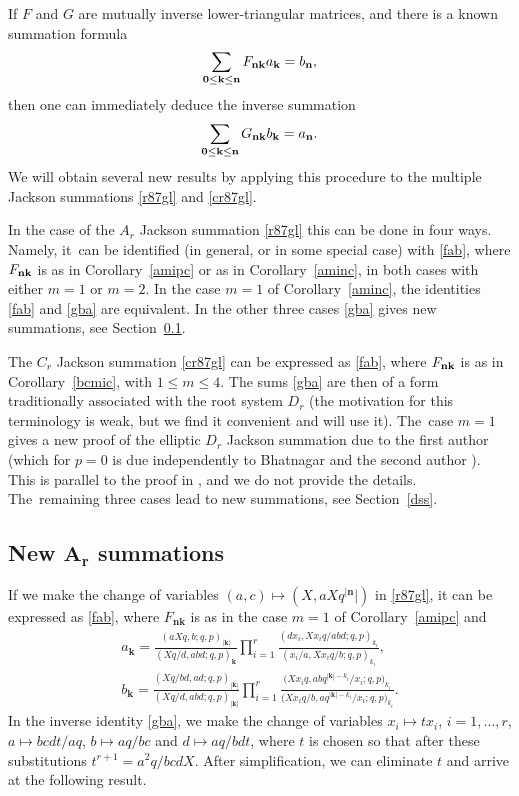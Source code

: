 \documentclass[pdftex]{sigma}%
\numberwithin{equation}{section}
\newcommand\bn{\mathbf n}
\newcommand\bk{\mathbf k}
\begin{document}
If $F$ and $G$ are mutually inverse lower-triangular matrices, and there is a known summation formula
\begin{gather}\label{fab}
\sum_{\bf 0\leq \bk \leq \bn}F_{\bf n\bf k}a_{\bk}=b_{\bn},
\end{gather}
then one can immediately deduce the inverse summation
\begin{gather}\label{gba}
\sum_{\bf 0\leq \bk \leq \bn}G_{\bf n\bf k}b_{\bk}=a_{\bn}.
\end{gather}
We will obtain several new results by applying this procedure to the multiple Jackson summations
\eqref{r87gl} and \eqref{cr87gl}.

In the case of the $A_r$ Jackson summation \eqref{r87gl} this can be done in four ways.
Namely, it~can be identified (in general, or in some special case) with \eqref{fab}, where $F_{\bf n\bf k}$ is as in Corollary~\ref{amipc} or as in Corollary~\ref{aminc}, in both cases with either $m=1$ or $m=2$. In the case $m=1$ of
 Corollary~\ref{aminc}, the identities \eqref{fab} and \eqref{gba} are equivalent. In the other three cases \eqref{gba} gives new summations, see Section~\ref{jss}.

The $C_r$ Jackson summation \eqref{cr87gl} can be expressed as \eqref{fab}, where
 $F_{\bf n\bf k}$ is as in Corollary~\ref{bcmic}, with $1\leq m\leq 4$.
 The sums \eqref{gba} are then of a form traditionally associated with the root system $D_r$ (the motivation for this terminology is weak, but we find it convenient and will use it). The~case $m=1$ gives a new proof of the elliptic $D_r$ Jackson
summation due to the first author \cite[Corollary~6.3]{r} (which for $p=0$ is due independently
to Bhatnagar \cite{b2} and
 the second author \cite{s}).
 This is parallel to the proof in \cite{s}, and we do not provide the details.
 The~remaining three cases lead to new summations, see Section~\ref{dss}.

\subsection[New Ar summations]{New $\boldsymbol{A_r}$ summations}\label{jss}


If we make the change of variables $(a,c)\mapsto (X,aXq^{|\bn}|)$ in \eqref{r87gl}, it can be expressed as \eqref{fab}, where $F_{\bn\bk}$ is as in the case $m=1$ of Corollary~\ref{amipc} and
\begin{gather*}
a_{\bk}=\frac{(aXq,b;q,p)_{|\bk|}}{(Xq/d,abd;q,p)_{\bk}}
\prod\limits_{i=1}^r\frac{(dx_i,Xx_iq/abd;q,p)_{k_i}}{(x_i/a,Xx_iq/b;q,p)_{k_i}},
\\
b_{\bk}=\frac{(Xq/bd,ad;q,p)_{|\bk|}}{(Xq/d,abd;q,p)_{|\bk|}}
\prod\limits_{i=1}^r\frac{\big(Xx_iq,abq^{|\bk|-k_i}/x_i;q,p\big)_{k_i}}
{\big(Xx_iq/b,aq^{|\bk|-k_i}/x_i;q,p\big)_{k_i}}.
\end{gather*}
 In the inverse identity \eqref{gba}, we make the change of variables
$x_i\mapsto tx_i$, $i=1,\dots,r$, $a\mapsto bcdt/aq$, $b\mapsto aq/bc$ and $d\mapsto aq/bdt$, where $t$ is chosen so that after these substitutions
$t^{r+1}={a^2q}/{bcdX}$.
After simplification,
 we can eliminate $t$ and arrive at the following result.
\end{document}
